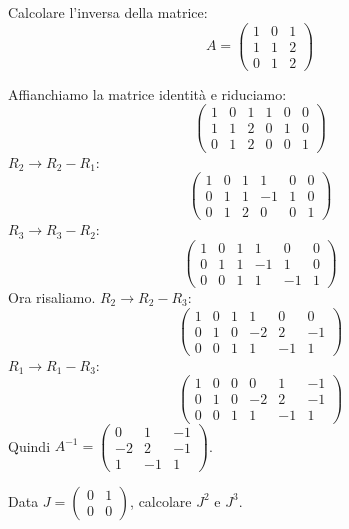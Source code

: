 \begin{exercisebox}[title={Esercizio 2: Inversa con Gauss-Jordan}]
Calcolare l'inversa della matrice:
$$ A = \begin{pmatrix} 1 & 0 & 1 \\ 1 & 1 & 2 \\ 0 & 1 & 2 \end{pmatrix} $$
\end{exercisebox}

\begin{solbox}
Affianchiamo la matrice identità e riduciamo:
$$ \left(\begin{array}{ccc|ccc} 
1 & 0 & 1 & 1 & 0 & 0 \\ 
1 & 1 & 2 & 0 & 1 & 0 \\ 
0 & 1 & 2 & 0 & 0 & 1 
\end{array}\right) $$
$R_2 \to R_2 - R_1$:
$$ \left(\begin{array}{ccc|ccc} 1 & 0 & 1 & 1 & 0 & 0 \\ 0 & 1 & 1 & -1 & 1 & 0 \\ 0 & 1 & 2 & 0 & 0 & 1 \end{array}\right) $$
$R_3 \to R_3 - R_2$:
$$ \left(\begin{array}{ccc|ccc} 1 & 0 & 1 & 1 & 0 & 0 \\ 0 & 1 & 1 & -1 & 1 & 0 \\ 0 & 0 & 1 & 1 & -1 & 1 \end{array}\right) $$
Ora risaliamo. $R_2 \to R_2 - R_3$:
$$ \left(\begin{array}{ccc|ccc} 1 & 0 & 1 & 1 & 0 & 0 \\ 0 & 1 & 0 & -2 & 2 & -1 \\ 0 & 0 & 1 & 1 & -1 & 1 \end{array}\right) $$
$R_1 \to R_1 - R_3$:
$$ \left(\begin{array}{ccc|ccc} 1 & 0 & 0 & 0 & 1 & -1 \\ 0 & 1 & 0 & -2 & 2 & -1 \\ 0 & 0 & 1 & 1 & -1 & 1 \end{array}\right) $$
Quindi $A^{-1} = \begin{pmatrix} 0 & 1 & -1 \\ -2 & 2 & -1 \\ 1 & -1 & 1 \end{pmatrix}$.
\end{solbox}

\begin{exercisebox}[title={Esercizio 3: Potenze di Matrici}]
Data $J = \begin{pmatrix} 0 & 1 \\ 0 & 0 \end{pmatrix}$, calcolare $J^2$ e $J^3$.
\end{exercisebox}

